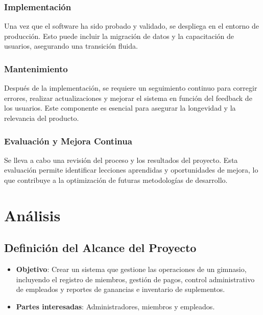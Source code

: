 \documentclass[spanish, 12pt]{article}
\providecommand{\tightlist}{\setlength{\itemsep}{0pt}
\setlength{\parskip}{0pt}}
\begin{document}
	\subsubsection{Implementación}
	\label{implementaciuxf3n}

	Una vez que el software ha sido probado y validado, se despliega en el entorno
	de producción. Esto puede incluir la migración de datos y la capacitación de usuarios,
	asegurando una transición fluida.

	\subsubsection{Mantenimiento}
	\label{mantenimiento}

	Después de la implementación, se requiere un seguimiento continuo para
	corregir errores, realizar actualizaciones y mejorar el sistema en función del
	feedback de los usuarios. Este componente es esencial para asegurar la
	longevidad y la relevancia del producto.

	\subsubsection{Evaluación y Mejora Continua}
	\label{evaluaciuxf3n-y-mejora-continua}

	Se lleva a cabo una revisión del proceso y los resultados del proyecto. Esta
	evaluación permite identificar lecciones aprendidas y oportunidades de mejora,
	lo que contribuye a la optimización de futuras metodologías de desarrollo.

	\section{Análisis}
	\label{anuxe1lisis}

	\subsection{Definición del Alcance del Proyecto}
	\label{definiciuxf3n-del-alcance-del-proyecto}

	\begin{itemize}
		\tightlist

		\item \textbf{Objetivo}: Crear un sistema que gestione las operaciones de un
			gimnasio, incluyendo el registro de miembros, gestión de pagos, control
			administrativo de empleados y reportes de ganancias e inventario de
			suplementos.

		\item \textbf{Partes interesadas}: Administradores, miembros y empleados.
	\end{itemize}
\end{document}
